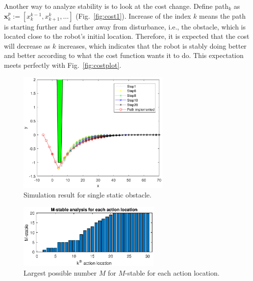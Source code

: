  



Another way to analyze stability is to look at the cost change. Define path$_k$ as $\mathbf{x}_{k}^{p} := [x_{k}^{k-1},x_{k+1}^{k},\ldots]$ (Fig.~\ref{fig:cost1}). Increase of the index $k$ means the path is starting further and further away from disturbance, i.e., the obstacle, which is located close to the robot's initial location. Therefore, it is expected that the cost will decrease as $k$ increases, which indicates that the robot is stably doing better and better according to what the cost function wants it to do. This expectation meets perfectly with Fig.~\ref{fig:costplot}. 

\begin{figure}[t]
\begin{center}
\includegraphics[width=7.5cm]{plot/1_1.eps}
\caption{Simulation result for single static obstacle.  }
\label{fig:1_1}
\end{center}
\end{figure}


\begin{figure}[t]
\begin{center}
\includegraphics[width=7cm]{plot/1_2.eps}
\caption{Largest possible number $M$ for $M$-stable for each action location.}
\label{fig:1_3}
\end{center}
\end{figure}



